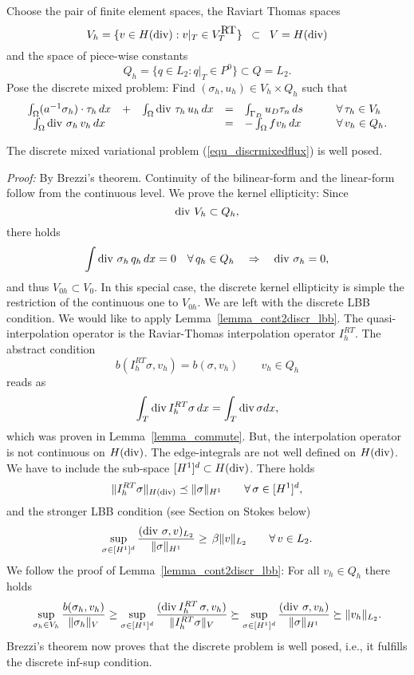 Choose the pair of finite element spaces, the Raviart Thomas spaces
$$
V_h = \{ v \in H(\operatorname{div}) : v|_T \in V_T^{\mbox{RT}} \} \; \; \subset \; \;
V = H(\operatorname{div})
$$
and the space of piece-wise constants
$$
Q_h = \{ q \in L_2 : q|_T \in P^0 \}  \subset Q = L_2.
$$
Pose the discrete mixed problem: Find $(\sigma_h, u_h) \in V_h \times Q_h$
such that
\begin{equation} \label{equ_discrmixedflux}
\begin{array}{ccccll}
\int_\Omega (a^{-1} \sigma_h) \cdot \tau_h \, dx & + & 
\int_\Omega \operatorname{div} \, \tau_h  \, u_h \, dx & = & \int_{\Gamma_D} u_D \tau _n \, ds \qquad & \forall \, \tau_h \in V_h \\
\int_\Omega \operatorname{div} \, \sigma_h \, v_h \, dx & & & = & - \int_\Omega f v_h \, dx \qquad & \forall \, v_h \in Q_h.
\end{array}
\end{equation}
%
\begin{lemma} The discrete mixed variational 
problem (\ref{equ_discrmixedflux}) is well posed.
\end{lemma}
{\em Proof:} By Brezzi's theorem. Continuity of the bilinear-form and
the linear-form follow from the continuous level. We prove the
kernel ellipticity: Since
$$
\operatorname{div} \, V_h \subset Q_h, 
$$
there holds
$$
\int \operatorname{div} \, \sigma_h \, q_h \, dx = 0 \quad \forall \, q_h \in Q_h
\quad \Rightarrow \quad \operatorname{div} \, \sigma_h = 0,
$$
and thus $V_{0h} \subset V_0$. In this special case, the discrete
kernel ellipticity is simple the restriction of the continuous one to
$V_{0h}$.
We are left with the discrete LBB condition. We would like to apply
Lemma~\ref{lemma_cont2discr_lbb}. The quasi-interpolation operator 
is the Raviar-Thomas interpolation operator $I_h^{RT}$. The abstract
condition
$$
b(I_h^{RT} \sigma , v_h) = b(\sigma, v_h) \qquad v_h \in Q_h
$$
reads as
$$
\int_T \operatorname{div} I_h^{RT} \sigma \, dx = \int_T \operatorname{div} \sigma dx,
$$
which was proven in Lemma~\ref{lemma_commute}. But, the interpolation
operator is not continuous on $H(\operatorname{div})$. The edge-integrals are not
well defined on $H(\operatorname{div})$. We have to include the
sub-space $[H^1]^d \subset H(\operatorname{div})$. There holds
$$
\| I_h^{RT} \sigma \|_{H(\operatorname{div})} \preceq \| \sigma \|_{H^1} \qquad \forall \, \sigma \in [H^1]^d,
$$
and the stronger LBB condition (see Section on Stokes below)
$$
\sup_{\sigma \in [H^1]^d} \frac{ (\operatorname{div} \, \sigma, v)_{L_2} } { \| \sigma \|_{H^1}} \geq \, \beta \| v \|_{L_2} \qquad \forall \, v \in L_2.
$$
We follow the proof of Lemma~\ref{lemma_cont2discr_lbb}:
 For all $v_h \in Q_h$ there holds
$$
\sup_{\sigma_h \in V_h} \frac { b(\sigma_h, v_h) }{\| \sigma_h \|_V}
\geq 
\sup_{\sigma \in [H^1]^d} \frac{ (\operatorname{div} I_h^{RT} \, \sigma, v_h)}{\| I_h^{RT} \sigma \|_V}
\succeq 
\sup_{\sigma \in [H^1]^d} \frac{ (\operatorname{div} \, \sigma, v_h) }{  \| \sigma \|_{H^1} }
\succeq
\| v_h \|_{L_2}.
$$
Brezzi's theorem now proves that the discrete problem is well posed, i.e.,
it fulfills the discrete inf-sup condition.

